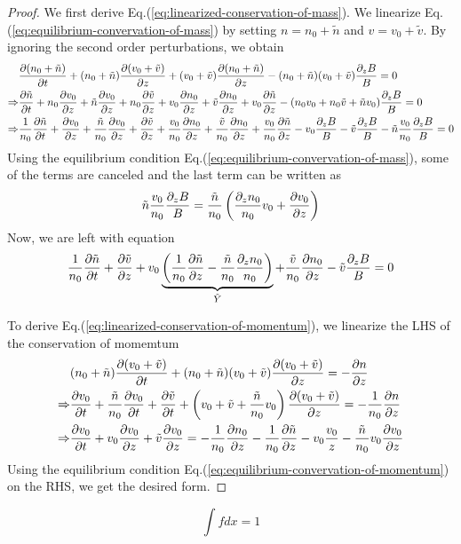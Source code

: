 \begin{proof}
    We first derive Eq.(\ref{eq:linearized-conservation-of-mass}). We linearize Eq.(\ref{eq:equilibrium-convervation-of-mass}) by setting $n=n_0+\tilde{n}$ and $v=v_0+\tilde{v}$. By ignoring the second order perturbations, we obtain
    \begin{align*}
        &\pdv{(n_0+\tilde{n})}{t} 
        + (n_0+\tilde{n})\pdv{(v_0+\tilde{v})}{z} 
        + (v_0+\tilde{v})\pdv{(n_0+\tilde{n})}{z} 
        - (n_0+\tilde{n})(v_0+\tilde{v})\frac{\partial_z B}{B} = 0 \\
        \Rightarrow 
        &\pdv{\tilde{n}}{t} 
        + n_0\pdv{v_0}{z} + \tilde{n}\pdv{v_0}{z} + n_0\pdv{\tilde{v}}{z}
        + v_0\pdv{n_0}{z} + \tilde{v}\pdv{n_0}{z} + v_0\pdv{\tilde{n}}{z} 
        - (n_0v_0 + n_0\tilde{v} + \tilde{n}v_0)\frac{\partial_z B}{B} = 0 \\
        \Rightarrow
        &\frac{1}{n_0}\pdv{\tilde{n}}{t} 
        + \pdv{v_0}{z} + \frac{\tilde{n}}{n_0}\pdv{v_0}{z} + \pdv{\tilde{v}}{z}
        + \frac{v_0}{n_0}\pdv{n_0}{z} + \frac{\tilde{v}}{n_0}\pdv{n_0}{z} + \frac{v_0}{n_0}\pdv{\tilde{n}}{z} 
        - v_0\frac{\partial_z B}{B} - \tilde{v}\frac{\partial_z B}{B} - \tilde{n}\frac{v_0}{n_0}\frac{\partial_z B}{B} = 0
    \end{align*}
    Using the equilibrium condition Eq.(\ref{eq:equilibrium-convervation-of-mass}), some of the terms are canceled and the last term can be written as 
    \[ \tilde{n}\frac{v_0}{n_0}\frac{\partial_z B}{B} = \frac{\tilde{n}}{n_0}\left( \frac{\partial_z n_0}{n_0}v_0 + \pdv{v_0}{z} \right) \]
    Now, we are left with equation
    \[
        \frac{1}{n_0}\pdv{\tilde{n}}{t}
        + \pdv{\tilde{v}}{z}
        + v_0\underbrace{\left(\frac{1}{n_0}\pdv{\tilde{n}}{z} - \frac{\tilde{n}}{n_0}\frac{\partial_z n_0}{n_0}  \right)}_{\tilde{Y}}
        + \frac{\tilde{v}}{n_0}\pdv{n_0}{z}
        - \tilde{v}\frac{\partial_z B}{B} = 0
    \]

    To derive Eq.(\ref{eq:linearized-conservation-of-momentum}), we linearize the LHS of the conservation of momemtum
    \begin{align*}
        &(n_0+\tilde{n})\pdv{(v_0+\tilde{v})}{t} + (n_0+\tilde{n})(v_0+\tilde{v})\pdv{(v_0+\tilde{v})}{z} = -\pdv{n}{z} \\
        \Rightarrow 
        & \pdv{v_0}{t} + \frac{\tilde{n}}{n_0}\pdv{v_0}{t} + \pdv{\tilde{v}}{t} 
        + \left(v_0+\tilde{v}+\frac{\tilde{n}}{n_0}v_0\right)\pdv{(v_0+\tilde{v})}{z} = -\frac{1}{n_0}\pdv{n}{z}\\
        \Rightarrow
        & \pdv{v_0}{t} + v_0\pdv{v_0}{z} + \tilde{v}\pdv{v_0}{z} 
        = -\frac{1}{n_0}\pdv{n_0}{z} -\frac{1}{n_0}\pdv{\tilde{n}}{z} -v_0\frac{v_0}{z} - \frac{\tilde{n}}{n_0}v_0\pdv{v_0}{z} \\ 
    \end{align*}
    Using the equilibrium condition Eq.(\ref{eq:equilibrium-convervation-of-momentum}) on the RHS, we get the desired form.
\end{proof}

\[ \int fdx = 1 \]

\cite{stellingwerf_stability_1978}